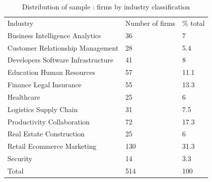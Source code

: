 \documentclass[12pt]{article}
\begin{document}

\begin{table} [ht]
\caption{Distribution of sample : firms by industry classification}
\begin{spacing}{0.75}
\scriptsize
\renewcommand{\arraystretch}{1.5}
\begin{tabularx}{\textwidth}{ p{10cm} p{1.5cm} p{1.5cm} }
\toprule
\multicolumn{1}{l}{Industry}&\multicolumn{1}{l}{Number of firms}&\multicolumn{1}{l}{\% total}\\
\cmidrule(r){2-3}
Business Intelligence Analytics & 36 & 7 \\
Customer Relationship Management & 28 & 5.4 \\
Developers Software Infrastructure & 41 & 8 \\
Education Human Resources & 57 & 11.1 \\
Finance Legal Insurance & 55 & 13.3 \\
Healthcare & 25 & 6 \\
Logistics Supply Chain & 31 & 7.5 \\
Productivity Collaboration & 72 & 17.3 \\
Real Estate Construction & 25 & 6 \\
Retail Ecommerce Marketing & 130 & 31.3 \\
Security & 14 & 3.3 \\
\cmidrule(r){2-3}
Total & 514 & 100 \\
\midrule
\end{tabularx}
\label{table2}
\end{spacing}
\end{table}
\end{document}
